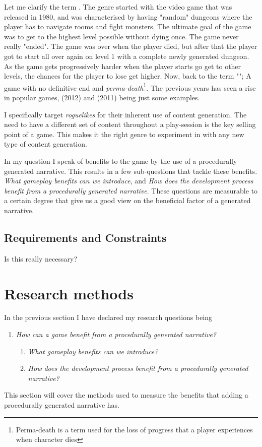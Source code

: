 Let me clarify the term \rogue. The genre started with the video game  that was released in 1980, and was characterised by having "random" dungeons where the player has to navigate rooms and fight monsters. The ultimate goal of the game was to get to the highest level possible without dying once. The game never really "ended". The game was over when the player died, but after that the player got to start all over again on level 1 with a complete newly generated dungeon. As the game gets progressively harder when the player starts go get to other levels, the chances for the player to lose get higher. Now, back to the term "\rogue"; A game with no definitive end and \textit{perma-death}\footnote{Perma-death is a term used for the loss of progress that a player experiences when \his character dies}. 
The previous years has seen a rise in popular \rogue games,  (2012) and  (2011) being just some examples.

I specifically target \textit{roguelikes} for their inherent use of content generation. The need to have a different set of content throughout a play-session is the key selling point of a \rogue game. This makes it the right genre to experiment in with any new type of content generation.

In my question I speak of benefits to the game by the use of a procedurally generated narrative. This results in a few sub-questions that tackle these benefits. \textit{What gameplay benefits can we introduce}, and \textit{How does the development process benefit from a procedurally generated narrative}. These questions are measurable to a certain degree that give us a good view on the beneficial factor of a generated narrative.

\subsection{Requirements and Constraints}
Is this really necessary? 

\section{Research methods}
In the previous section I have declared my research questions being
\begin{enumerate}
	\item \textit{How can a \rogue game benefit from a procedurally generated narrative?}
	\begin{enumerate}
	\item \textit{What gameplay benefits can we introduce?} \label{rq:1a}
	\item \textit{How does the development process benefit from a procedurally generated narrative?} \label{rq:2a}
	\end{enumerate}
\end{enumerate}
This section will cover the methods used to measure the benefits that adding a procedurally generated narrative has.

